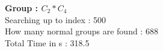 \textbf{Group : $C_2*C_4$}\\
Searching up to index : 500\\
How many normal groups are found : 688\\
Total Time in s : 318.5\\
